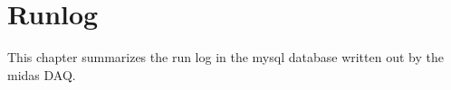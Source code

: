 \chapter{Runlog}
\label{chap:runlog}

This chapter summarizes the run log in the mysql database written out by the \ac{midas} DAQ.
